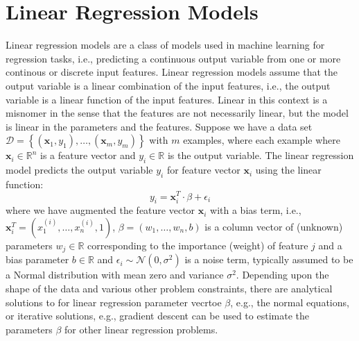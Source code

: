 \documentclass{article}[12pt]
\def\R{\mathbb{R}}
\begin{document}
\section{Linear Regression Models}
Linear regression models are a class of models used in machine learning for regression tasks, i.e., predicting a continuous output variable from one or more continous or discrete input features.
Linear regression models assume that the output variable is a linear combination of the input features, i.e., the output variable is a linear function of the input features.
Linear in this context is a misnomer in the sense that the features are not necessarily linear, but the model is linear in the parameters and the features.
Suppose we have a data set $\mathcal{D} = \left\{(\mathbf{x}_{1},y_{1}),\dotsc,(\mathbf{x}_{m},y_{m})\right\}$ with $m$ examples, where each example where $\mathbf{x}_{i}\in\R^{n}$ is a feature vector and $y_{i}\in\R$ is the output variable.
The linear regression model predicts the output variable $y_{i}$ for feature vector $\mathbf{x}_{i}$ using the linear function:
\begin{equation*}
    y_{i} = \mathbf{x}_{i}^{T}\cdot\beta + \epsilon_{i}
\end{equation*}
where we have augmented the feature vector $\mathbf{x}_{i}$ with a bias term, i.e., $\mathbf{x}_{i}^{T} = \left(x^{(i)}_{1},\dots,x^{(i)}_{n},1\right)$, $\beta = \left(w_{1},\dots,w_{n},b\right)$ is a column vector of (unknown) parameters $w_{j}\in\R$ corresponding to the importance (weight) of feature $j$ and a bias parameter $b\in\R$
and $\epsilon_{i}\sim\mathcal{N}(0,\sigma^{2})$ is a noise term, typically assumed to be a Normal distribution with mean zero and variance $\sigma^{2}$.
Depending upon the shape of the data and various other problem constraints, there are analytical solutions to for linear regression parameter vecrtoe $\beta$, e.g., the normal equations, or iterative solutions, e.g., gradient descent can be used to estimate the parameters $\beta$ for other linear regression problems.
\end{document}

